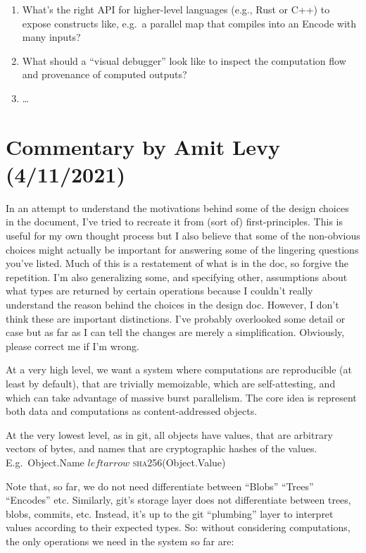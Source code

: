 \documentclass{article}
\newcommand{\encode}{\textrm{Encode}\xspace}
\newcommand{\bs}{\vspace{\baselineskip}}
\begin{document}
\begin{enumerate}[itemsep=0pt]
\item What's the right API for higher-level languages (e.g., Rust or C++) to expose constructs like, e.g.~a parallel map that compiles into an \encode with many inputs?

\item What should a ``visual debugger'' look like to inspect the computation flow and provenance of computed outputs?
  
\item \ldots
  
\end{enumerate}

\section{Commentary by Amit Levy (4/11/2021)}

In an attempt to understand the motivations behind some of the design
choices in the document, I've tried to recreate it from (sort of)
first-principles. This is useful for my own thought process but I also
believe that some of the non-obvious choices might actually be
important for answering some of the lingering questions you've
listed. Much of this is a restatement of what is in the doc, so
forgive the repetition. I'm also generalizing some, and specifying
other, assumptions about what types are returned by certain operations
because I couldn't really understand the reason behind the choices in
the design doc. However, I don't think these are important
distinctions. I've probably overlooked some detail or case but as far
as I can tell the changes are merely a simplification. Obviously,
please correct me if I'm wrong.

\bs

At a very high level, we want a system where computations are
reproducible (at least by default), that are trivially memoizable,
which are self-attesting, and which can take advantage of massive
burst parallelism. The core idea is represent both data and
computations as content-addressed objects.

\bs

At the very lowest level, as in git, all objects have values, that are
arbitrary vectors of bytes, and names that are cryptographic hashes of
the values. E.g.~Object.Name $leftarrow$ \textsc{sha256}(Object.Value)

\bs

Note that, so far, we do not need differentiate between ``Blobs''
``Trees'' ``Encodes'' etc. Similarly, git's storage layer does not
differentiate between trees, blobs, commits, etc. Instead, it's up to
the git ``plumbing'' layer to interpret values according to their
expected types. So: without considering computations, the only
operations we need in the system so far are:
\end{document}
